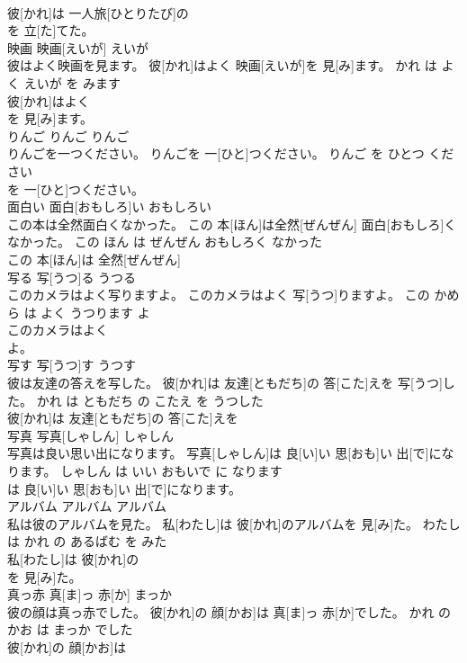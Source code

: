\documentclass[8pt]{extreport}
\begin{document}
\begin{CJK}{UTF8}{min}
\\	彼[かれ]は 一人旅[ひとりたび]の
\\	を 立[た]てた。		
\\	映画	映画[えいが]	えいが	
\\	彼はよく映画を見ます。	彼[かれ]はよく 映画[えいが]を 見[み]ます。	かれ は よく えいが を みます	
\\	彼[かれ]はよく
\\	を 見[み]ます。		
\\	りんご	りんご	りんご	
\\	りんごを一つください。	りんごを 一[ひと]つください。	りんご を ひとつ ください	
\\	を 一[ひと]つください。		
\\	面白い	面白[おもしろ]い	おもしろい	
\\	この本は全然面白くなかった。	この 本[ほん]は全然[ぜんぜん] 面白[おもしろ]くなかった。	この ほん は ぜんぜん おもしろく なかった	
\\	この 本[ほん]は 全然[ぜんぜん]
\\	写る	写[うつ]る	うつる	
\\	このカメラはよく写りますよ。	このカメラはよく 写[うつ]りますよ。	この かめら は よく うつります よ	
\\	このカメラはよく
\\	よ。		
\\	写す	写[うつ]す	うつす	
\\	彼は友達の答えを写した。	彼[かれ]は 友達[ともだち]の 答[こた]えを 写[うつ]した。	かれ は ともだち の こたえ を うつした	
\\	彼[かれ]は 友達[ともだち]の 答[こた]えを
\\	写真	写真[しゃしん]	しゃしん	
\\	写真は良い思い出になります。	写真[しゃしん]は 良[い]い 思[おも]い 出[で]になります。	しゃしん は いい おもいで に なります	
\\	は 良[い]い 思[おも]い 出[で]になります。		
\\	アルバム	アルバム	アルバム	
\\	私は彼のアルバムを見た。	私[わたし]は 彼[かれ]のアルバムを 見[み]た。	わたし は かれ の あるばむ を みた	
\\	私[わたし]は 彼[かれ]の
\\	を 見[み]た。		
\\	真っ赤	真[ま]っ 赤[か]	まっか	
\\	彼の顔は真っ赤でした。	彼[かれ]の 顔[かお]は 真[ま]っ 赤[か]でした。	かれ の かお は まっか でした	
\\	彼[かれ]の 顔[かお]は

\end{CJK}
\end{document}

